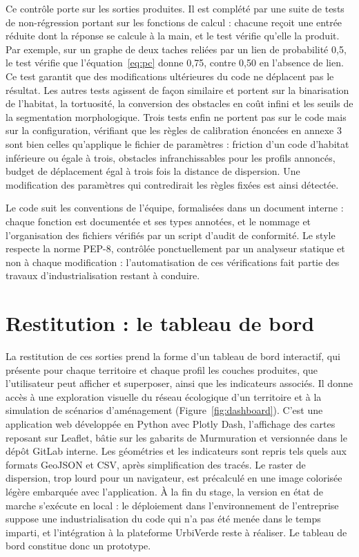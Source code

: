 \documentclass[a4paper,12pt]{report}
\begin{document}
Ce contrôle porte sur les sorties produites. Il est complété par une suite de tests de non-régression portant sur les fonctions de calcul : chacune reçoit une entrée réduite dont la réponse se calcule à la main, et le test vérifie qu'elle la produit. Par exemple, sur un graphe de deux taches reliées par un lien de probabilité 0,5, le test vérifie que l'équation~\eqref{eq:pc} donne 0,75, contre 0,50 en l'absence de lien. Ce test garantit que des modifications ultérieures du code ne déplacent pas le résultat. Les autres tests agissent de façon similaire et portent sur la binarisation de l'habitat, la tortuosité, la conversion des obstacles en coût infini et les seuils de la segmentation morphologique. Trois tests enfin ne portent pas sur le code mais sur la configuration, vérifiant que les règles de calibration énoncées en annexe 3 sont bien celles qu'applique le fichier de paramètres : friction d'un code d'habitat inférieure ou égale à trois, obstacles infranchissables pour les profils annoncés, budget de déplacement égal à trois fois la distance de dispersion. Une modification des paramètres qui contredirait les règles fixées est ainsi détectée. 

Le code suit les conventions de l'équipe, formalisées dans un document interne : chaque fonction est documentée et ses types annotées, et le nommage et l'organisation des fichiers vérifiés par un script d'audit de conformité. Le style respecte la norme PEP-8, contrôlée ponctuellement par un analyseur statique et non à chaque modification : l'automatisation de ces vérifications fait partie des travaux d'industrialisation restant à conduire.

\section{Restitution : le tableau de bord}
La restitution de ces sorties prend la forme d'un tableau de bord interactif, qui présente pour chaque territoire et chaque profil les couches produites, que l'utilisateur peut afficher et superposer, ainsi que les indicateurs associés. Il donne accès à une exploration visuelle du réseau écologique d'un territoire et à la simulation de scénarios d'aménagement (Figure~\ref{fig:dashboard}). C'est une application web développée en Python avec Plotly Dash, l'affichage des cartes reposant sur Leaflet, bâtie sur les gabarits de Murmuration et versionnée dans le dépôt GitLab interne. Les géométries et les indicateurs sont repris tels quels aux formats GeoJSON et CSV, après simplification des tracés. Le raster de dispersion, trop lourd pour un navigateur, est précalculé en une image colorisée légère embarquée avec l'application. À la fin du stage, la version en état de marche s'exécute en local : le déploiement dans l'environnement de l'entreprise suppose une industrialisation du code qui n'a pas été menée dans le temps imparti, et l'intégration à la plateforme UrbiVerde reste à réaliser. Le tableau de bord constitue donc un prototype. 
\end{document}
